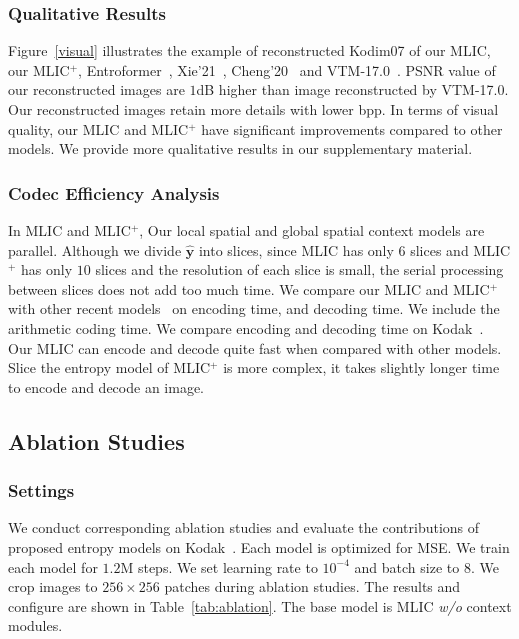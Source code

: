 \documentclass[sigconf]{acmart}
\begin{document}
\subsubsection{Qualitative Results}
    Figure~\ref{visual} illustrates the example of reconstructed Kodim07 of our MLIC,
    our MLIC$^+$, Entroformer~\cite{DBLP:journals/corr/abs-2202-05492},
    Xie'21~\cite{DBLP:conf/mm/XieCC21}, Cheng'20~\cite{DBLP:conf/cvpr/ChengSTK20}
    and VTM-17.0~\cite{vtm2019}. PSNR value of our reconstructed images are $1$dB
    higher than image reconstructed by VTM-17.0. Our reconstructed images retain
    more details with lower bpp. In terms of visual quality, our MLIC and MLIC$^+$
    have significant improvements compared to other models. We provide more qualitative
    results in our supplementary material.
\subsubsection{Codec Efficiency Analysis}
In MLIC and MLIC$^+$, Our local spatial and global spatial context models are parallel.
Although we divide $\hat {\boldsymbol y}$ into slices,
since MLIC has only $6$ slices and MLIC$^+$ has
only $10$ slices and the resolution of each slice is small,
the serial processing between slices does not add too much time.
We compare our MLIC and MLIC$^+$ with
other recent models~\cite{DBLP:conf/cvpr/ChengSTK20,DBLP:conf/icip/MinnenS20,
DBLP:conf/mm/XieCC21,DBLP:journals/corr/abs-2202-05492,
DBLP:journals/corr/abs-2203-08450,He_2022_CVPR}
on encoding time, and decoding time.
We include the arithmetic coding time.
We compare encoding and decoding time on Kodak~\cite{kodak}.
Our MLIC can encode and decode quite fast when compared with other models.
Slice the entropy model of MLIC$^+$ is more complex, it takes slightly longer time to
encode and decode an image.
\subsection{Ablation Studies}
\subsubsection{Settings}
We conduct corresponding ablation studies and
evaluate the contributions of proposed entropy models on
Kodak~\cite{kodak}.
Each model is optimized for MSE.
We train each model for $1.2$M steps.
We set learning rate to $10^{-4}$ and batch size to $8$. We crop images to $256\times 256$
patches during ablation studies.
The results and configure are shown in Table~\ref{tab:ablation}.
The base model is MLIC \textit{w/o} context modules.
\end{document}
